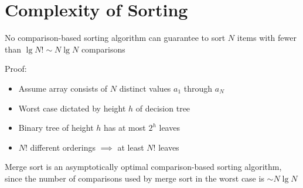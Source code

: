 \documentclass[8pt,a4paper,compress]{beamer}
\begin{document}
\section{Complexity of Sorting}
\begin{frame}[fragile]
\pause

No comparison-based sorting algorithm can guarantee to sort $N$ items with fewer than $\lg N! \sim N\lg N$ comparisons

\pause
\bigskip

\begin{minipage}{150pt}
Proof: \begin{itemize}
\item Assume array consists of $N$ distinct values $a_1$ through $a_N$
\item Worst case dictated by height $h$ of decision tree
\item Binary tree of height $h$ has at most $2^h$ leaves
\item $N!$ different orderings $\implies$ at least $N!$ leaves
\end{itemize}
\end{minipage}
\begin{minipage}{150pt}
\end{minipage}

\pause
\bigskip

Merge sort is an asymptotically optimal comparison-based sorting algorithm, since the number of comparisons used by merge sort in the worst case is $\sim N\lg N$
\end{frame}
\end{document}

